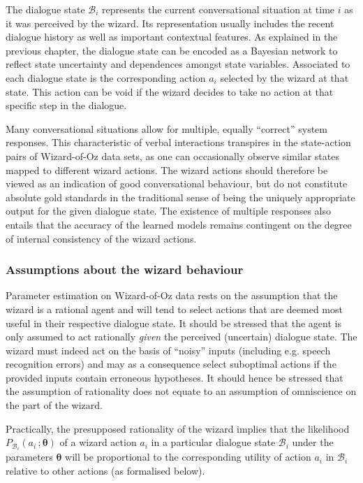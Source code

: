 The dialogue state $\mathcal{B}_i$ represents the current conversational situation at time $i$ as it was perceived by the wizard.  Its representation usually includes the recent dialogue history as well as important contextual features.  As explained in the previous chapter, the dialogue state can be encoded as a Bayesian network to reflect state uncertainty and dependences amongst state variables. Associated to each dialogue state is the corresponding action $a_i$ selected by the wizard at that state. This action can be void if the wizard decides to take no action at that specific step in the dialogue. 


Many conversational situations allow for multiple, equally ``correct'' system responses.  This characteristic of verbal interactions transpires in the state-action pairs of Wizard-of-Oz data sets, as one can occasionally observe similar states mapped to different wizard actions. The wizard actions should therefore be viewed as an indication of good conversational behaviour, but do not constitute absolute gold standards in the traditional sense of being the uniquely appropriate output for the given dialogue state. The existence of multiple responses also entails that the accuracy of the learned models remains contingent on the degree of internal consistency of the wizard actions. 

\subsubsection*{Assumptions about the wizard behaviour}

Parameter estimation on Wizard-of-Oz data rests on the assumption that the wizard is a rational agent and will tend to select actions that are deemed most useful in their respective dialogue state. It should be stressed that the agent is only assumed to act rationally \textit{given} the perceived (uncertain) dialogue state. The wizard must indeed act on the basis of ``noisy'' inputs (including e.g. speech recognition errors) and may as a consequence select suboptimal actions if the provided inputs contain erroneous hypotheses. It should hence be stressed that the assumption of rationality does not equate to an assumption of omniscience on the part of the wizard. 

Practically, the presupposed rationality of the wizard implies that the likelihood $P_{\mathcal{B}_i}(a_i\,; \boldsymbol\theta)$ of a wizard action $a_i$ in a particular dialogue state $\mathcal{B}_i$ under the parameters $\boldsymbol\theta$ will be proportional to the corresponding utility of action $a_i$ in $\mathcal{B}_i$ relative to other actions (as formalised below).

